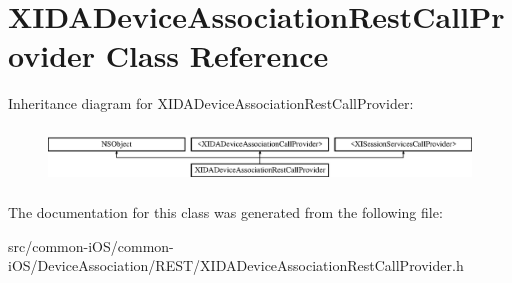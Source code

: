 \hypertarget{interface_x_i_d_a_device_association_rest_call_provider}{}\section{X\+I\+D\+A\+Device\+Association\+Rest\+Call\+Provider Class Reference}
\label{interface_x_i_d_a_device_association_rest_call_provider}
Inheritance diagram for X\+I\+D\+A\+Device\+Association\+Rest\+Call\+Provider\+:\begin{figure}[H]
\begin{center}
\leavevmode
\includegraphics[height=1.493333cm]{interface_x_i_d_a_device_association_rest_call_provider}
\end{center}
\end{figure}


The documentation for this class was generated from the following file\+:\begin{DoxyCompactItemize}
\item 
src/common-\/i\+O\+S/common-\/i\+O\+S/\+Device\+Association/\+R\+E\+S\+T/X\+I\+D\+A\+Device\+Association\+Rest\+Call\+Provider.\+h\end{DoxyCompactItemize}
